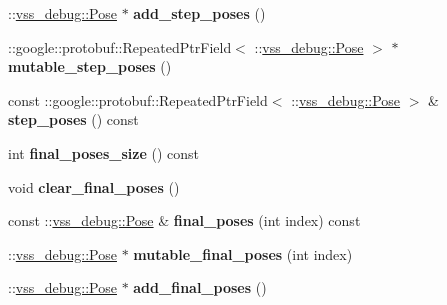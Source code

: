 \begin{DoxyCompactItemize}
\item 
\+::\hyperlink{classvss__debug_1_1Pose}{vss\+\_\+debug\+::\+Pose} $\ast$ {\bfseries add\+\_\+step\+\_\+poses} ()\hypertarget{classvss__debug_1_1Global__Debug_aa52b079237ff39110c0bb42c97648dd6}{}\label{classvss__debug_1_1Global__Debug_aa52b079237ff39110c0bb42c97648dd6}

\item 
\+::google\+::protobuf\+::\+Repeated\+Ptr\+Field$<$ \+::\hyperlink{classvss__debug_1_1Pose}{vss\+\_\+debug\+::\+Pose} $>$ $\ast$ {\bfseries mutable\+\_\+step\+\_\+poses} ()\hypertarget{classvss__debug_1_1Global__Debug_a35be76a7e3ffd42f3f43b6676be22688}{}\label{classvss__debug_1_1Global__Debug_a35be76a7e3ffd42f3f43b6676be22688}

\item 
const \+::google\+::protobuf\+::\+Repeated\+Ptr\+Field$<$ \+::\hyperlink{classvss__debug_1_1Pose}{vss\+\_\+debug\+::\+Pose} $>$ \& {\bfseries step\+\_\+poses} () const \hypertarget{classvss__debug_1_1Global__Debug_aae1517eb31c23cb51b729f8513892db4}{}\label{classvss__debug_1_1Global__Debug_aae1517eb31c23cb51b729f8513892db4}

\item 
int {\bfseries final\+\_\+poses\+\_\+size} () const \hypertarget{classvss__debug_1_1Global__Debug_a6492c0c4517a7fb0b8c4582bd88f1aef}{}\label{classvss__debug_1_1Global__Debug_a6492c0c4517a7fb0b8c4582bd88f1aef}

\item 
void {\bfseries clear\+\_\+final\+\_\+poses} ()\hypertarget{classvss__debug_1_1Global__Debug_aefe1c43236fc3165c2a4c5fde4042c61}{}\label{classvss__debug_1_1Global__Debug_aefe1c43236fc3165c2a4c5fde4042c61}

\item 
const \+::\hyperlink{classvss__debug_1_1Pose}{vss\+\_\+debug\+::\+Pose} \& {\bfseries final\+\_\+poses} (int index) const \hypertarget{classvss__debug_1_1Global__Debug_a9e589bb4ef01d15b6a60b6295af9c319}{}\label{classvss__debug_1_1Global__Debug_a9e589bb4ef01d15b6a60b6295af9c319}

\item 
\+::\hyperlink{classvss__debug_1_1Pose}{vss\+\_\+debug\+::\+Pose} $\ast$ {\bfseries mutable\+\_\+final\+\_\+poses} (int index)\hypertarget{classvss__debug_1_1Global__Debug_aafdb8a1c2aa99c0faf1931cc3deac496}{}\label{classvss__debug_1_1Global__Debug_aafdb8a1c2aa99c0faf1931cc3deac496}

\item 
\+::\hyperlink{classvss__debug_1_1Pose}{vss\+\_\+debug\+::\+Pose} $\ast$ {\bfseries add\+\_\+final\+\_\+poses} ()\hypertarget{classvss__debug_1_1Global__Debug_ac43bdd0a4cc721c989b520db88224fd7}{}\label{classvss__debug_1_1Global__Debug_ac43bdd0a4cc721c989b520db88224fd7}


\end{DoxyCompactItemize}
